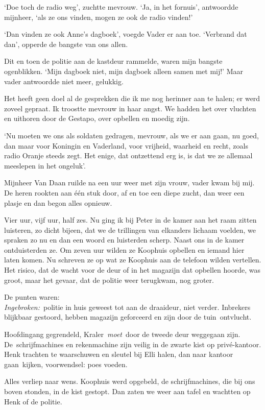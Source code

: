 \documentclass{book}
\begin{document}
`Doe toch de radio weg', zuchtte mevrouw. `Ja, in het fornuis',
antwoordde mijnheer, `als ze ons vinden, mogen ze ook de radio vinden!'

`Dan vinden ze ook Anne's dagboek', voegde Vader er aan toe. `Verbrand
dat dan', opperde de bangste van ons allen.

Dit en toen de politie aan de kastdeur rammelde, waren mijn bangste
ogenblikken. `Mijn dagboek niet, mijn dagboek alleen samen met mij!'
Maar vader antwoordde niet meer, gelukkig.

Het heeft geen doel al de gesprekken die ik me nog herinner aan te
halen; er werd zoveel gepraat. Ik troostte mevrouw in haar angst. We
hadden het over vluchten en uithoren door de Gestapo, over opbellen en
moedig zijn.

`Nu moeten we ons als soldaten gedragen, mevrouw, als we er aan gaan, nu
goed, dan maar voor Koningin en Vaderland, voor vrijheid, waarheid en
recht, zoals radio Oranje steeds zegt. Het enige, dat ontzettend erg is,
is dat we ze allemaal meeslepen in het ongeluk'.

Mijnheer Van Daan ruilde na een uur weer met zijn vrouw, vader kwam bij
mij. De heren rookten aan één stuk door, af en toe een diepe zucht, dan
weer een plasje en dan begon alles opnieuw.

Vier uur, vijf uur, half zes. Nu ging ik bij Peter in de kamer aan het
raam zitten luisteren, zo dicht bijeen, dat we de trillingen van
elkanders lichaam voelden, we spraken zo nu en dan een woord en
luisterden scherp. Naast ons in de kamer ontduisterden ze. Om zeven uur
wilden ze Koophuis opbellen en iemand hier laten komen. Nu schreven ze
op wat ze Koophuis aan de telefoon wilden vertellen. Het risico, dat de
wacht voor de deur of in het magazijn dat opbellen hoorde, was groot,
maar het gevaar, dat de politie weer terugkwam, nog groter.

De punten waren:\\\emph{Ingebroken:}~politie in huis geweest tot aan de
draaideur, niet verder. Inbrekers blijkbaar gestoord, hebben magazijn
geforceerd en zijn door de tuin~ontvlucht.

Hoofdingang gegrendeld, Kraler~\emph{moet}~door de tweede deur weggegaan
zijn. De~schrijfmachines en rekenmachine zijn veilig in de zwarte kist
op privé-kantoor. Henk trachten te waarschuwen en sleutel bij Elli
halen, dan naar kantoor gaan~kijken, voorwendsel: poes voeden.

Alles verliep naar wens. Koophuis werd opgebeld, de schrijfmachines, die
bij ons boven stonden, in de kist gestopt. Dan zaten we weer aan tafel
en wachtten op Henk of de politie.
\end{document}
